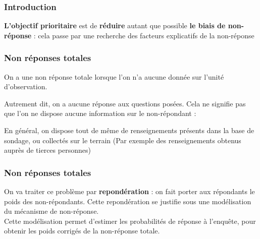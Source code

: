 \begin{frame}
	\frametitle{Introduction}

\textbf{L’objectif prioritaire} est de \textbf{réduire} autant que possible \textbf{le biais de
non-réponse} : cela passe par une recherche des facteurs explicatifs de la non-réponse

\end{frame}




\begin{frame}
	\frametitle{Non réponses totales }
	
On a une non réponse totale lorsque l’on n’a aucune donnée sur l’unité d’observation. \\ \vspace{0.5cm}

Autrement dit, on a aucune réponse aux questions posées. Cela ne signifie pas que l'on ne dispose aucune information sur le non-répondant : \\  \vspace{0.5cm}

En général, on dispose tout de même de renseignements présents dans la base de sondage, ou collectés sur le terrain (Par exemple des renseignements obtenus auprès de tierces personnes)


	
\end{frame}



\begin{frame}
	\frametitle{Non réponses totales }
On va traiter ce problème par \textbf{repondération} : on fait porter aux répondants le poids des non-répondants. Cette repondération se justifie sous une modélisation du mécanisme de non-réponse.\\ \vspace{0.5cm}
Cette modélisation permet d’estimer les probabilités de réponse à
l’enquête, pour obtenir les poids corrigés de la non-réponse totale.
\end{frame}

